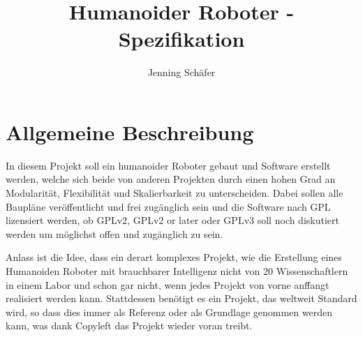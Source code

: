 \documentclass[11pt]{amsart}
\title{Humanoider Roboter - Spezifikation}
\author{Jenning Sch\"afer}
\begin{document}
\maketitle
\tableofcontents
\section{Allgemeine Beschreibung}
In diesem Projekt soll ein humanoider Roboter gebaut und Software erstellt werden, welche sich beide von anderen Projekten durch einen hohen Grad an Modularit\"at, Flexibilit\"at und Skalierbarkeit zu unterscheiden. Dabei sollen alle Baupl\"ane ver\"offentlicht und frei zug\"anglich sein und die Software nach GPL lizensiert werden, ob GPLv2, GPLv2 or later oder GPLv3 soll noch diskutiert werden um m\"oglichst offen und zug\"anglich zu sein. 

Anlass ist die Idee, dass ein derart komplexes Projekt, wie die Erstellung eines Humanoiden Roboter mit brauchbarer Intelligenz nicht von 20 Wissenschaftlern in einem Labor und schon gar nicht, wenn jedes Projekt von vorne anf\"fangt realisiert werden kann. Stattdessen ben\"otigt es ein Projekt, das weltweit Standard wird, so dass dies immer als Referenz oder als Grundlage genommen werden kann, was dank Copyleft das Projekt wieder voran treibt.
\end{document}
